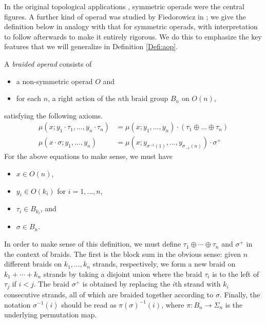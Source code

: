 \documentclass{amsbook} %
\numberwithin{section}{chapter}
\begin{document}
In the original topological applications \cite{maygeom}, symmetric operads were the central figures.  A further kind of operad was studied by Fiedorowicz in \cite{fie-br}; we give the definition below in analogy with that for symmetric operads, with interpretation to follow afterwards to make it entirely rigorous.  We do this to emphasize the key features that we will generalize in Definition \ref{Defi:aop}.

\begin{Defi}\label{broperad}
A \textit{braided operad} consists of
  \begin{itemize}
    \item a non-symmetric operad $O$ and
    \item for each $n$, a right action of the $n$th braid group $B_{n}$ on $O(n)$,
  \end{itemize}
satisfying the following axioms.
  \begin{align*}
    \mu(x;y_1 \cdot \tau_1,\ldots,y_n \cdot \tau_n) &= \mu(x;y_1,\ldots,y_n)\cdot(\tau_1 \oplus \ldots \oplus \tau_n)\\
    \mu(x \cdot \sigma; y_1, \ldots, y_n) &= \mu\left(x;y_{\sigma^{-1}(1)},\ldots,y_{\sigma_{-1}(n)}\right)\cdot \sigma^+
  \end{align*}
For the above equations to make sense, we must have
  \begin{itemize}
      \item $x \in O(n)$,
      \item $y_{i} \in O(k_{i})$ for $i=1, \ldots, n$,
      \item $\tau_{i} \in B_{k_{i}}$, and
      \item $\sigma \in B_{n}$.
  \end{itemize}
\end{Defi}

In order to make sense of this definition, we must define $\tau_{1} \oplus \cdots \oplus \tau_{n}$ and $\sigma^{+}$ in the context of braids.  The first is the block sum in the obvious sense:  given $n$ different braids on $k_{1}, \ldots, k_{n}$ strands, respectively, we form a new braid on $k_{1} + \cdots + k_{n}$ strands by taking a disjoint union where the braid $\tau_{i}$ is to the left of $\tau_{j}$ if $i < j$.  The braid $\sigma^{+}$ is obtained by replacing the $i$th strand with $k_{i}$ consecutive strands, all of which are braided together according to $\sigma$.  Finally, the notation $\sigma^{-1}(i)$ should be read as $\pi(\sigma)^{-1}(i)$, where $\pi \colon B_{n} \rightarrow \Sigma_{n}$ is the underlying permutation map.
\end{document}
